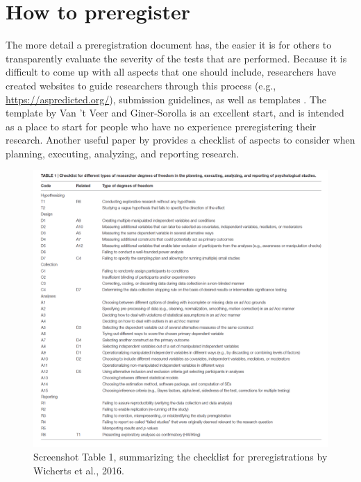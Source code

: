 \documentclass[
  oneside]{book}
\begin{document}
\hypertarget{how-to-preregister}{%
\section{How to preregister}\label{how-to-preregister}}

The more detail a preregistration document has, the easier it is for others to transparently evaluate the severity of the tests that are performed. Because it is difficult to come up with all aspects that one should include, researchers have created websites to guide researchers through this process (e.g., \url{https://aspredicted.org/}), submission guidelines, as well as templates \citep{van_t_veer_pre-registration_2016}. The template by Van 't Veer and Giner-Sorolla is an excellent start, and is intended as a place to start for people who have no experience preregistering their research. Another useful paper by \citet{wicherts_degrees_2016} provides a checklist of aspects to consider when planning, executing, analyzing, and reporting research.

\begin{figure}

{\centering \includegraphics[width=1\linewidth]{images/preregchecklist} 

}

\caption{Screenshot Table 1, summarizing the checklist for preregistrations by Wicherts et al., 2016.}\label{fig:preregcheclist}
\end{figure}
\end{document}

